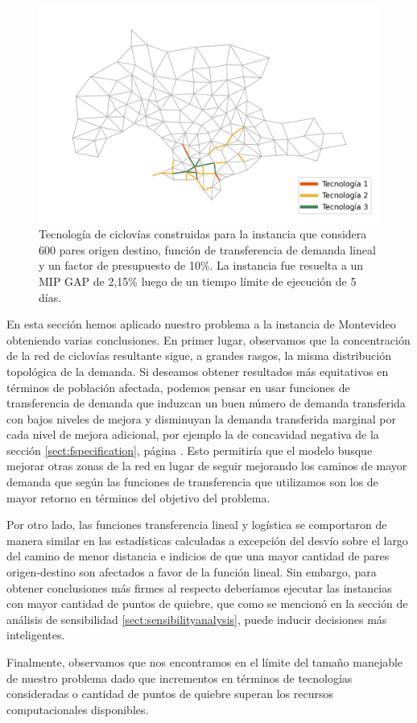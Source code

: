 \begin{figure}[h!]
  \centering
  \includegraphics[width=12cm]{../resources/montevideo_d3000.0_linear_0.1_budget_factor.png}
    \caption{Tecnología de ciclovías construidas para la instancia que considera 600 pares origen destino, función de transferencia de demanda lineal y un factor de presupuesto de 10\%. La instancia fue resuelta a un MIP GAP de 2,15\% luego de un tiempo límite de ejecución de 5 días.}
  \label{fig:montevideolowbudgetinstance}
\end{figure}

\FloatBarrier
En esta sección hemos aplicado nuestro problema a la instancia de Montevideo obteniendo varias conclusiones. En primer lugar, observamos que la concentración de la red de ciclovías resultante sigue, a grandes rasgos, la misma distribución topológica de la demanda. Si deseamos obtener resultados más equitativos en términos de población afectada, podemos pensar en usar funciones de transferencia de demanda que induzcan un buen número de demanda transferida con bajos niveles de mejora y disminuyan la demanda transferida marginal por cada nivel de mejora adicional, por ejemplo la de concavidad negativa de la sección \ref{sect:fspecification}, página \pageref{sect:fspecification}. Esto permitiría que el modelo busque mejorar otras zonas de la red en lugar de seguir mejorando los caminos de mayor demanda que según las funciones de transferencia que utilizamos son los de mayor retorno en términos del objetivo del problema.

Por otro lado, las funciones transferencia lineal y logística se comportaron de manera similar en las estadísticas calculadas a excepción del desvío sobre el largo del camino de menor distancia e indicios de que una mayor cantidad de pares origen-destino son afectados a favor de la función lineal. Sin embargo, para obtener conclusiones más firmes al respecto deberíamos ejecutar las instancias con mayor cantidad de puntos de quiebre, que como se mencionó en la sección de análisis de sensibilidad \ref{sect:sensibilityanalysis}, puede inducir decisiones más inteligentes.

Finalmente, observamos que nos encontramos en el límite del tamaño manejable de nuestro problema dado que incrementos en términos de tecnologías consideradas o cantidad de puntos de quiebre superan los recursos computacionales disponibles.
